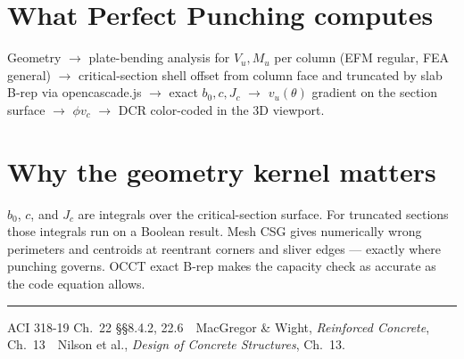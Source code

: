 \documentclass[10pt]{article}
\begin{document}
\section*{What Perfect Punching computes}
Geometry $\to$ plate-bending analysis for $V_u, M_u$ per column (EFM regular, FEA general) $\to$ critical-section shell offset from column face and truncated by slab B-rep via opencascade.js $\to$ exact $b_0, c, J_c$ $\to$ $v_u(\theta)$ gradient on the section surface $\to$ $\phi v_c$ $\to$ DCR color-coded in the 3D viewport.

\section*{Why the geometry kernel matters}
$b_0$, $c$, and $J_c$ are integrals over the critical-section surface. For truncated sections those integrals run on a Boolean result. Mesh CSG gives numerically wrong perimeters and centroids at reentrant corners and sliver edges --- exactly where punching governs. OCCT exact B-rep makes the capacity check as accurate as the code equation allows.

\vspace{2pt}\hrule\vspace{2pt}
{\scriptsize ACI 318-19 Ch.~22 \S\S 8.4.2, 22.6 \,\textbar\, MacGregor \& Wight, \emph{Reinforced Concrete}, Ch.~13 \,\textbar\, Nilson et al., \emph{Design of Concrete Structures}, Ch.~13.}
\end{document}
